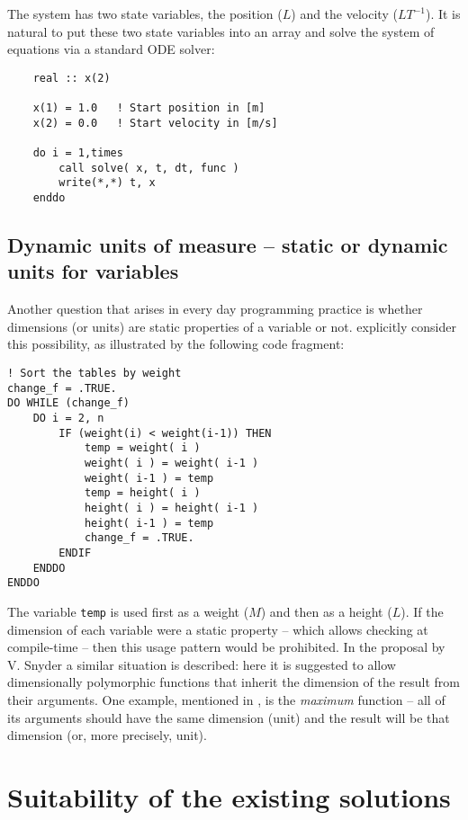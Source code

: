 \documentclass{article}
\begin{document}
The system has two state variables, the position ($L$) and the velocity ($L T^{-1}$). It is natural to put these two
state variables into an array and solve the system of equations via a standard ODE solver:
\begin{verbatim}
    real :: x(2)

    x(1) = 1.0   ! Start position in [m]
    x(2) = 0.0   ! Start velocity in [m/s]

    do i = 1,times
        call solve( x, t, dt, func )
        write(*,*) t, x
    enddo
\end{verbatim}

\subsection*{Dynamic units of measure -- static or dynamic units for variables}
Another question that arises in every day programming practice is whether dimensions (or units) are static properties
of a variable or not. \cite{FPTSymbolLives} explicitly consider this possibility, as illustrated by the following
code fragment:

\begin{verbatim}
! Sort the tables by weight
change_f = .TRUE.
DO WHILE (change_f)
    DO i = 2, n
        IF (weight(i) < weight(i-1)) THEN
            temp = weight( i )
            weight( i ) = weight( i-1 )
            weight( i-1 ) = temp
            temp = height( i )
            height( i ) = height( i-1 )
            height( i-1 ) = temp
            change_f = .TRUE.
        ENDIF
    ENDDO
ENDDO
\end{verbatim}

The variable \verb+temp+ is used first as a weight ($M$) and then as a height ($L$). If the dimension of each variable were
a static property -- which allows checking at compile-time -- then this usage pattern would be prohibited. In the proposal
by V. Snyder \cite{UnitsOfMeasureFortran,PhysicalEngineeringUnitsN2113} a similar situation is described: here it is suggested to allow dimensionally polymorphic
functions that inherit the dimension of the result from their arguments. One example, mentioned in \cite{SimConFPTCheckingUnits},
is the \emph{maximum} function -- all of its arguments should have the same dimension (unit) and the result will be that dimension
(or, more precisely, unit).


\section{Suitability of the existing solutions}
\end{document}
